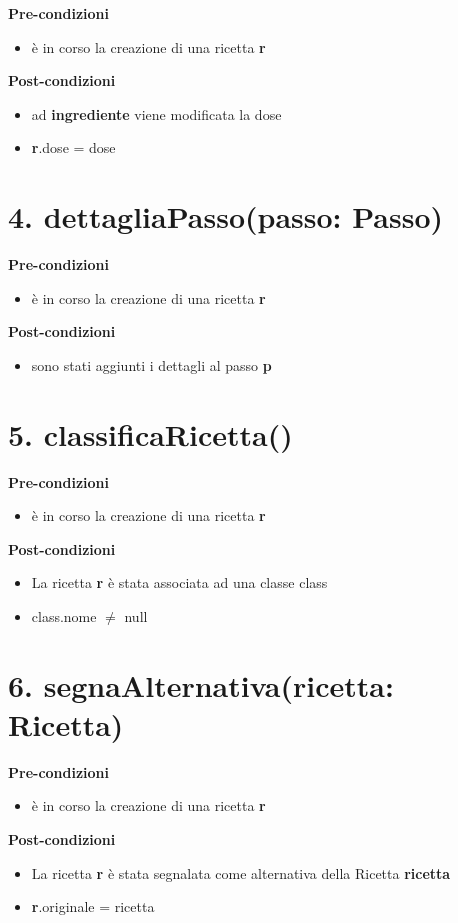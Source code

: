 \documentclass[14pt]{extarticle}
\begin{document}
\textbf{Pre-condizioni}
\begin{itemize}
  \item è in corso la creazione di una ricetta  \textbf{r}
\end{itemize}
\textbf{Post-condizioni}
\begin{itemize}
  \item ad  \textbf{ingrediente} viene modificata la dose
  \item \textbf{r}.dose = dose
\end{itemize}

\section*{4. dettagliaPasso(passo: Passo)}

\textbf{Pre-condizioni}
\begin{itemize}
  \item è in corso la creazione di una ricetta  \textbf{r}
\end{itemize}
\textbf{Post-condizioni}
\begin{itemize}
  \item sono stati aggiunti i dettagli al passo  \textbf{p}
\end{itemize}

\section*{5. classificaRicetta()}

\textbf{Pre-condizioni}
\begin{itemize}
  \item è in corso la creazione di una ricetta  \textbf{r}
\end{itemize}
\textbf{Post-condizioni}
\begin{itemize}
  \item La ricetta  \textbf{r} è stata associata ad una classe class
  \item class.nome $\neq$ null
\end{itemize}

\section*{6. segnaAlternativa(ricetta: Ricetta)}

\textbf{Pre-condizioni}
\begin{itemize}
  \item è in corso la creazione di una ricetta  \textbf{r}
\end{itemize}
\textbf{Post-condizioni}
\begin{itemize}
  \item La ricetta  \textbf{r} è stata segnalata come alternativa della Ricetta  \textbf{ricetta}
  \item \textbf{r}.originale = ricetta
\end{itemize}
\end{document}
